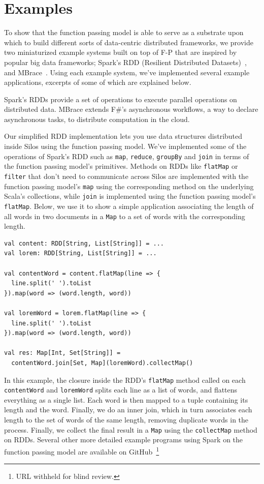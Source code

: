 \documentclass[preprint]{sigplanconf}
\theoremstyle{definition}
\theoremstyle{definition}
\begin{document}
\section{Examples}
\label{sec:examples}

To show that the function passing model is able to serve as a substrate upon
which to build different sorts of data-centric distributed frameworks, we
provide two miniaturized example systems built on top of F-P that are inspired
by popular big data frameworks; Spark's RDD (Resilient Distributed
Datasets)~\cite{Spark}, and MBrace~\cite{MBrace}. Using each example system,
we've implemented several example applications, excerpts of some of which are
explained below.

Spark's RDDs provide a set of operations to execute parallel operations on
distributed data. MBrace extends F\#’s asynchronous workflows, a way to declare
asynchronous tasks, to distribute computation in the cloud.

Our simplified RDD implementation lets you use data structures distributed
inside Silos using the function passing model. We've implemented some of the
operations of Spark’s RDD such as \verb|map|, \verb|reduce|, \verb|groupBy| and
\verb|join| in terms of the function passing model's primitives. Methods on RDDs
like \verb|flatMap| or \verb|filter| that don’t need to communicate across Silos
are implemented with the function passing model’s \verb|map| using the
corresponding method on the underlying Scala’s collections, while \verb|join| is
implemented using the function passing model’s \verb|flatMap|. Below, we use it
to show a simple application associating the length of all words in two
documents in a \verb|Map| to a set of words with the corresponding length.

\begin{lstlisting}
val content: RDD[String, List[String]] = ...
val lorem: RDD[String, List[String]] = ...

val contentWord = content.flatMap(line => {
  line.split(' ').toList
}).map(word => (word.length, word))

val loremWord = lorem.flatMap(line => {
  line.split(' ').toList
}).map(word => (word.length, word))

val res: Map[Int, Set[String]] =
  contentWord.join[Set, Map](loremWord).collectMap()
\end{lstlisting}

In this example, the closure inside the RDD's \verb|flatMap| method called on
each \verb|contentWord| and \verb|loremWord| splits each line as a list of
words, and flattens everything as a single list. Each word is then mapped to a
tuple containing its length and the word. Finally, we do an inner join, which in
turn associates each length to the set of words of the same length, removing
duplicate words in the process. Finally, we collect the final result in a
\verb|Map| using the \verb|collectMap| method on RDDs. Several other more
detailed example programs using Spark on the function passing model are
available on GitHub~\footnote{URL withheld for blind review.}
\end{document}
